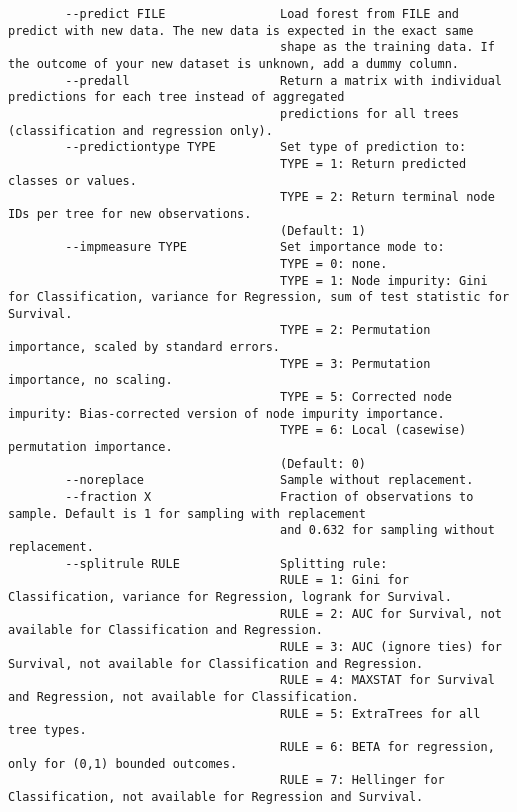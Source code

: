 \documentclass[12pt,oneside]{book}
\begin{document}
\begin{lstlisting}
        --predict FILE                Load forest from FILE and predict with new data. The new data is expected in the exact same 
                                      shape as the training data. If the outcome of your new dataset is unknown, add a dummy column.
        --predall                     Return a matrix with individual predictions for each tree instead of aggregated 
                                      predictions for all trees (classification and regression only).
        --predictiontype TYPE         Set type of prediction to:
                                      TYPE = 1: Return predicted classes or values.
                                      TYPE = 2: Return terminal node IDs per tree for new observations.
                                      (Default: 1)
        --impmeasure TYPE             Set importance mode to:
                                      TYPE = 0: none.
                                      TYPE = 1: Node impurity: Gini for Classification, variance for Regression, sum of test statistic for Survival.
                                      TYPE = 2: Permutation importance, scaled by standard errors.
                                      TYPE = 3: Permutation importance, no scaling.
                                      TYPE = 5: Corrected node impurity: Bias-corrected version of node impurity importance.
                                      TYPE = 6: Local (casewise) permutation importance.
                                      (Default: 0)
        --noreplace                   Sample without replacement.
        --fraction X                  Fraction of observations to sample. Default is 1 for sampling with replacement 
                                      and 0.632 for sampling without replacement.
        --splitrule RULE              Splitting rule:
                                      RULE = 1: Gini for Classification, variance for Regression, logrank for Survival.
                                      RULE = 2: AUC for Survival, not available for Classification and Regression.
                                      RULE = 3: AUC (ignore ties) for Survival, not available for Classification and Regression.
                                      RULE = 4: MAXSTAT for Survival and Regression, not available for Classification.
                                      RULE = 5: ExtraTrees for all tree types.
                                      RULE = 6: BETA for regression, only for (0,1) bounded outcomes.
                                      RULE = 7: Hellinger for Classification, not available for Regression and Survival.

\end{lstlisting}
\end{document}
